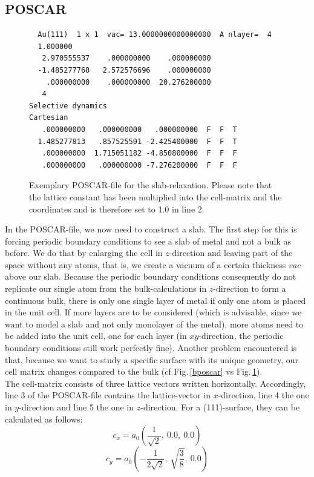 \documentclass[twoside, 11pt, titlepage, captions=nooneline, a4paper, headsepline]{scrbook}%
\newcommand{\9}{\mathrm}
\newcommand{\0}{\,\mathrm}
\begin{document}
\subsection{POSCAR}
\begin{figure}[h!!]
\begin{verbatim}
  Au(111)  1 x 1  vac= 13.0000000000000000  A nlayer=  4
  1.000000
   2.970555537    .000000000    .000000000
  -1.485277768   2.572576696    .000000000
    .000000000    .000000000  20.276200000
   4
Selective dynamics
Cartesian
   .000000000   .000000000   .000000000  F  F  T
  1.485277813   .857525591 -2.425400000  F  F  T
   .000000000  1.715051182 -4.850800000  F  F  F
   .000000000   .000000000 -7.276200000  F  F  F
\end{verbatim}
\caption{Exemplary POSCAR-file for the slab-relaxation. Please note that the lattice constant has been multiplied into the cell-matrix and the coordinates and is therefore set to 1.0 in line 2.}
\label{spos}
\end{figure}
In the POSCAR-file, we now need to construct a slab. The first step for this is forcing periodic boundary conditions to see a slab of metal and not a bulk as before. We do that by enlarging the cell in $z$-direction and leaving part of the space without any atoms, that is, we create a vacuum of a certain thickness $vac$ above our slab. Because the periodic boundary conditions consequently do not replicate our single atom from the bulk-calculations in $z$-direction to form a continuous bulk, there is only one single layer of metal if only one atom is placed in the unit cell. If more layers are to be considered (which is advisable, since we want to model a slab and not only monolayer of the metal), more atoms need to be added into the unit cell, one for each layer (in $xy$-direction, the periodic boundary conditions still work perfectly fine). Another problem encountered is that, because we want to study a specific surface with its unique geometry, our cell matrix changes compared to the bulk (cf Fig.\,\ref{bposcar} vs Fig.\,\ref{spos}).\\
The cell-matrix consists of three lattice vectors written horizontally. Accordingly, line 3 of the POSCAR-file contains the lattice-vector in $x$-direction, line 4 the one in $y$-direction and line 5 the one in $z$-direction. For a (111)-surface, they can be calculated as follows:
\begin{equation}
c_x=a_0\left(\frac{1}{\sqrt{2}}, ~0.0, ~0.0\right)
\end{equation}
\begin{equation}
c_y=a_0\left(-\frac{1}{2\sqrt{2}}, ~\sqrt{\frac{3}{8}}, ~0.0\right)
\end{equation}
\end{document}
